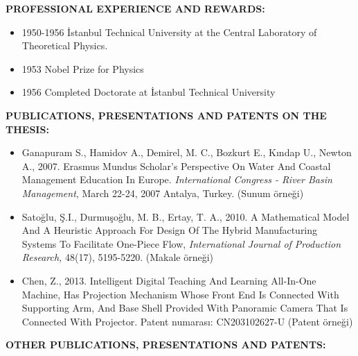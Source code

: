 \textbf{PROFESSIONAL EXPERIENCE AND REWARDS:}   
\vspace{-3mm}
\begin{itemize}
	\item 1950-1956 İstanbul Technical University at the Central Laboratory of Theoretical Physics.
	\item 1953 Nobel Prize for Physics
	\item 1956 Completed Doctorate at İstanbul Technical University
\end{itemize}

\textbf{PUBLICATIONS, PRESENTATIONS AND PATENTS ON THE THESIS:} 
\vspace{-3mm}
\begin{itemize}
	\item Ganapuram S., Hamidov A., Demirel, M. C., Bozkurt E., Kındap U., Newton A.,
	2007. Erasmus Mundus Scholar's Perspective On Water And Coastal
	Management Education In Europe. 
	\textit{International Congress - River Basin Management}, 
	March 22-24, 2007 Antalya, Turkey. (Sunum örneği)
	
	\item Satoğlu, Ş.I., Durmuşoğlu, M. B., Ertay, T. A., 2010. A Mathematical Model 
	And A Heuristic Approach For Design Of The Hybrid Manufacturing Systems 
	To Facilitate One-Piece Flow, 
	\textit{International Journal of Production Research,}
	48(17), 5195-5220. (Makale örneği)
	
	
	\item  Chen, Z., 2013. Intelligent Digital Teaching And Learning All-In-One Machine,
	Has Projection Mechanism Whose Front End Is Connected With Supporting
	Arm, And Base Shell Provided With Panoramic Camera That Is Connected With
	Projector. Patent numarası: CN203102627-U (Patent örneği)
\end{itemize}

\newpage

\textbf{OTHER PUBLICATIONS, PRESENTATIONS AND PATENTS:} 
\vspace{-3mm}
